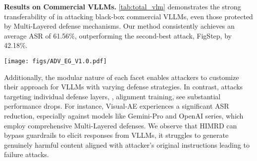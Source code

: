 \vspace{-3pt}
\noindent \textbf{Results on Commercial VLLMs.} \cref{tab:total_vlm} demonstrates the strong transferability of \mfa in attacking black-box commercial VLLMs, even those protected by Multi-Layered defense mechanisms. Our method consistently achieves an average ASR of 61.56\%, outperforming the second-best attack, FigStep, by 42.18\%. 
\clearpage
\begin{strip}
    \centering
    \begin{minipage}{\textwidth}
        \centering
        \vspace{-15pt}\texttt{[image: figs/ADV\_EG\_V1.0.pdf]}  
        \vspace{-20pt} 
     \label{fig:qualitative_results}
        \vspace{-5pt}
    \end{minipage}
\end{strip}





Additionally, the modular nature of each facet enables attackers to customize their approach for VLLMs with varying defense strategies.
In contrast, attacks targeting individual defense layers, \eg, alignment training, see substantial performance drops. For instance, Visual-AE experiences a significant ASR reduction, especially against models like Gemini-Pro and OpenAI series, which employ comprehensive Multi-Layered defenses. We observe that HIMRD can bypass guardrails to elicit responses from VLLMs, it struggles to generate genuinely harmful content aligned with  attacker's original instructions leading to failure attacks.





